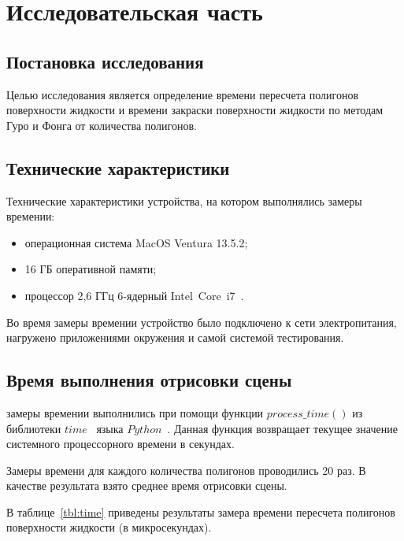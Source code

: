 \chapter{Исследовательская часть}

\section{Постановка исследования}

Целью исследования является определение времени пересчета полигонов поверхности жидкости и времени закраски поверхности жидкости по методам Гуро и Фонга от количества полигонов.



\section{Технические характеристики}

Технические характеристики устройства, на котором выполнялись замеры времении:
\begin{itemize}[label={---}]
	\item операционная система MacOS Ventura 13.5.2;
	\item 16 ГБ оперативной памяти;
    \item процессор 2,6 ГГц 6‑ядерный Intel Core i7~\cite{intel}.

\end{itemize}

Во время замеры времении устройство было подключено к сети электропитания, нагружено приложениями окружения и самой системой тестирования.

\section{Время выполнения отрисовки сцены}

замеры времении выполнились при помощи функции $process\_time()$ из библиотеки $time$~\cite{pythonlangtime} языка $Python$~\cite{python}. 
Данная функция возвращает текущее значение системного процессорного времени в секундах.

Замеры времени для каждого количества полигонов проводились 20 раз. 
В качестве результата взято среднее время отрисовки сцены. 

В таблице~\ref{tbl:time} приведены результаты замера времени пересчета полигонов поверхности жидкости (в микросекундах). 


